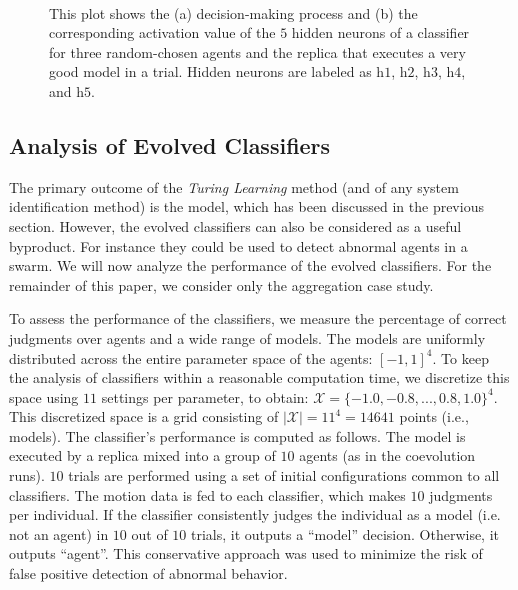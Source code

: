 \begin{figure}[!t]%
	\centering
		\\
		\caption{This plot shows the (a) decision-making process and (b) the corresponding activation value of the $5$ hidden neurons of a classifier for three random-chosen agents and the replica that executes a very good model in a trial. Hidden neurons are labeled as $\textrm{h}1$, $\textrm{h}2$, $\textrm{h}3$, $\textrm{h}4$, and $\textrm{h}5$.}
		\label{fig:classifier_output}
\end{figure}

\subsection{Analysis of Evolved Classifiers}\label{sec:analysis_evolved_classifiers_swarm_simulation}

The primary outcome of the \textit{Turing Learning} method (and of any system identification method) is the model, which has been discussed in the previous section. However, the evolved classifiers can also be considered as a useful byproduct. For instance they could be used to detect abnormal agents in a swarm. We will now analyze the performance of the evolved classifiers. For the remainder of this paper, we consider only the aggregation case study.

To assess the performance of the classifiers, we measure the percentage of correct judgments over agents and a wide range of models. The models are uniformly distributed across the entire parameter space of the agents: $[-1,1]^4$. To keep the analysis of classifiers within a reasonable computation time, we discretize this space using $11$ settings per parameter, to obtain: $\mathcal{X} = \{-1.0, -0.8, ..., 0.8, 1.0\}^4$. This discretized space is a grid consisting of $|\mathcal{X}|=11^4=14641$ points (i.e., models). The classifier's performance is computed as follows. The model is executed by a replica mixed into a group of $10$ agents (as in the coevolution runs). $10$ trials are performed using a set of initial configurations common to all classifiers. The motion data is fed to each classifier, which makes $10$ judgments per individual. If the classifier consistently judges the individual as a model (i.e. not an agent) in $10$ out of $10$ trials, it outputs a ``model'' decision. Otherwise, it outputs ``agent''. This conservative approach was used to minimize the risk of false positive detection of abnormal behavior.

